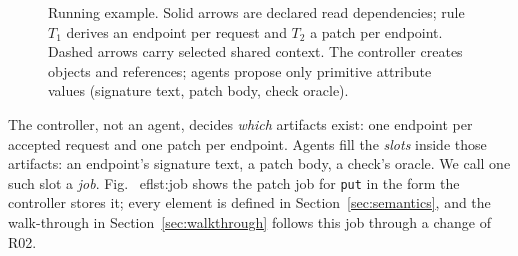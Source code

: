 \begin{figure}[!t]
\centering
{}%
\caption{Running example. Solid arrows are declared read dependencies; rule $T_1$ derives an endpoint per request and $T_2$ a patch per endpoint. Dashed arrows carry selected shared context. The controller creates objects and references; agents propose only primitive attribute values (signature text, patch body, check oracle).}\label{fig:network}
\end{figure}

The controller, not an agent, decides \emph{which} artifacts exist: one endpoint per accepted request and one patch per endpoint. Agents fill the \emph{slots} inside those artifacts: an endpoint's signature text, a patch body, a check's oracle. We call one such slot a \emph{job}. Fig.~
ef{lst:job} shows the patch job for \texttt{put} in the form the controller stores it; every element is defined in Section~\ref{sec:semantics}, and the walk-through in Section~\ref{sec:walkthrough} follows this job through a change of R02.

